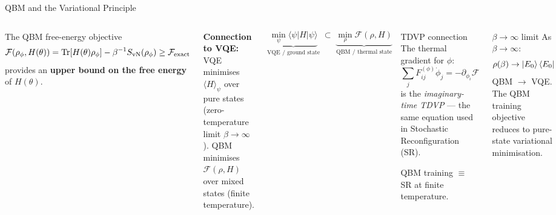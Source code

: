 \documentclass[aspectratio=169,10pt]{beamer}
\begin{document}
\begin{frame}{QBM and the Variational Principle}
  \begin{columns}[T]
      The QBM free-energy objective
      \[
        \mathcal{F}(\rho_\phi,H(\theta))
        = \Tr[H(\theta)\rho_\phi]
          - \beta^{-1}S_{\rm vN}(\rho_\phi)
        \ge \mathcal{F}_{\rm exact}
      \]
      provides an \textbf{upper bound on the free energy}
      of $H(\theta)$.

      \textbf{Connection to VQE:}\\
      VQE minimises $\langle H\rangle_\psi$ over pure states
      (zero-temperature limit $\beta\to\infty$).
      QBM minimises $\mathcal{F}(\rho,H)$ over mixed states
      (finite temperature).

      \[
        \underbrace{\min_\psi\langle\psi|H|\psi\rangle}_{\text{VQE / ground state}}
        \;\subset\;
        \underbrace{\min_\rho\mathcal{F}(\rho,H)}_{\text{QBM / thermal state}}
      \]
      \begin{block}{TDVP connection}
        The thermal gradient for $\phi$:
        \[
          \sum_j F_{ij}^{(\phi)}\dot\phi_j
          = -\partial_{\phi_i}\mathcal{F}
        \]
        is the \emph{imaginary-time TDVP} — the same
        equation used in Stochastic Reconfiguration (SR).

        QBM training $\equiv$ SR at finite temperature.
      \end{block}
      \vspace{0.2cm}
      \begin{alertblock}{$\beta\to\infty$ limit}
        As $\beta\to\infty$:
        \[
          \rho(\beta)\to\ket{E_0}\bra{E_0}
        \]
        QBM $\to$ VQE.
        The QBM training objective reduces to pure-state
        variational minimisation.
      \end{alertblock}
  \end{columns}
\end{frame}
\end{document}
